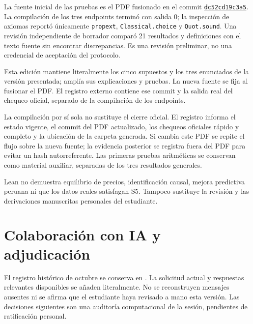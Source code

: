 \documentclass[11pt]{article}
\theoremstyle{definition}\newtheorem{assumption}{Supuesto}
\begin{document}
La fuente inicial de las pruebas es el PDF fusionado en el commit
\href{https://github.com/fgalarzac/ai-project/commit/dc52cd19c3a53b4350c1cba1cf8b4a11037b95ad}{\texttt{dc52cd19c3a5}}. La compilación de los tres
endpoints terminó con salida 0; la inspección de axiomas reportó únicamente
\texttt{propext}, \texttt{Classical.choice} y \texttt{Quot.sound}.
Una revisión independiente de borrador comparó 21 resultados y definiciones
con el texto fuente sin encontrar discrepancias. Es una revisión preliminar,
no una credencial de aceptación del protocolo.

Esta edición mantiene literalmente los cinco supuestos y los tres enunciados
de la versión presentada; amplía sus explicaciones y pruebas. La nueva fuente
se fija al fusionar el PDF. El registro externo contiene ese commit y la
salida real del chequeo oficial, separado de la compilación de los endpoints.

La compilación por sí sola no sustituye el cierre oficial. El registro
 informa el estado vigente, el commit del PDF
actualizado, los chequeos oficiales rápido y completo y la ubicación de la
carpeta generada. Si cambia este PDF se repite el flujo sobre la nueva fuente;
la evidencia posterior se registra fuera del PDF para evitar un hash
autorreferente. Las primeras pruebas aritméticas se conservan como material
auxiliar, separadas de los tres resultados generales.

Lean no demuestra equilibrio de precios, identificación causal, mejora
predictiva peruana ni que los datos reales satisfagan S5. Tampoco sustituye
la revisión y las derivaciones manuscritas personales del estudiante.

\section{Colaboración con IA y adjudicación}
El registro histórico de octubre se conserva en . La
solicitud actual y respuestas relevantes disponibles se añaden literalmente.
No se reconstruyen mensajes ausentes ni se afirma que el estudiante haya
revisado a mano esta versión. Las decisiones siguientes son una auditoría
computacional de la sesión, pendientes de ratificación personal.
\end{document}
